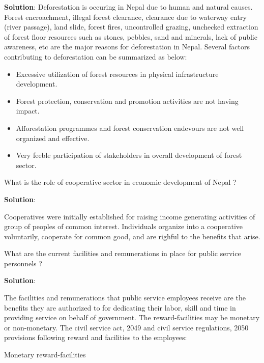 \documentclass[
]{book}
\newcommand{\question}{\item}
\newenvironment{solution}{ {\bfseries Solution}:}{}
\begin{document}
\begin{questions}
\begin{solution}
Deforestation is occuring in Nepal due to human and natural causes. Forest encroachment, illegal forest clearance, clearance due to waterway entry (river passage), land slide, forest fires, uncontrolled grazing, unchecked extraction of forest floor resources such as stones, pebbles, sand and minerals, lack of public awareness, etc are the major reasons for deforestation in Nepal. Several factors contributing to deforestation can be summarized as below:
\begin{itemize}
\item Excessive utilization of forest resources in physical infrastructure development.
\item Forest protection, conservation and promotion activities are not having impact.
\item Afforestation programmes and forest conservation endevours are not well organized and effective.
\item Very feeble participation of stakeholders in overall development of forest sector.
\end{itemize}
\end{solution}

\question What is the role of cooperative sector in economic development of Nepal ?

\begin{solution}

Cooperatives were initially established for raising income generating activities of group of peoples of common interest. Individuals organize into a cooperative voluntarily, cooperate for common good, and are righful to the benefits that arise.

\end{solution}

\question What are the current facilities and remunerations in place for public service personnels ?

\begin{solution}

The facilities and remunerations that public service employees receive are the benefits they are authorized to for dedicating their labor, skill and time in providing service on behalf of government. The reward-facilities may be monetary or non-monetary. The civil service act, 2049 and civil service regulations, 2050 provisions following reward and facilities to the employees:

Monetary reward-facilities


\end{solution}
\end{questions}
\end{document}
